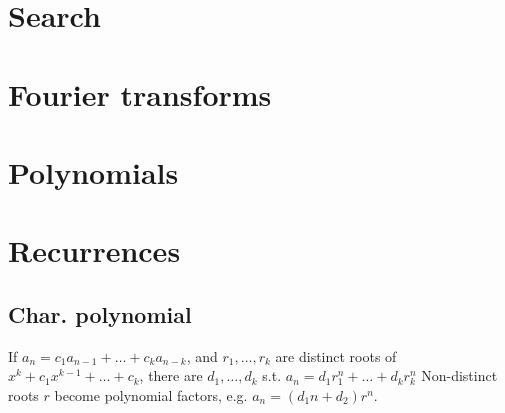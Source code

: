 \section{Search}


\section{Fourier transforms}


\section{Polynomials}

\section{Recurrences}
    
	\subsection{Char. polynomial}

	If $a_n = c_1 a_{n-1} + \dots + c_k a_{n-k}$, and $r_1, \dots, r_k$ are distinct roots of $x^k + c_1 x^{k-1} + \dots + c_k$, there are $d_1, \dots, d_k$ s.t.
	$a_n = d_1r_1^n + \dots + d_kr_k^n$
	Non-distinct roots $r$ become polynomial factors, e.g. $a_n = (d_1n + d_2)r^n$.
